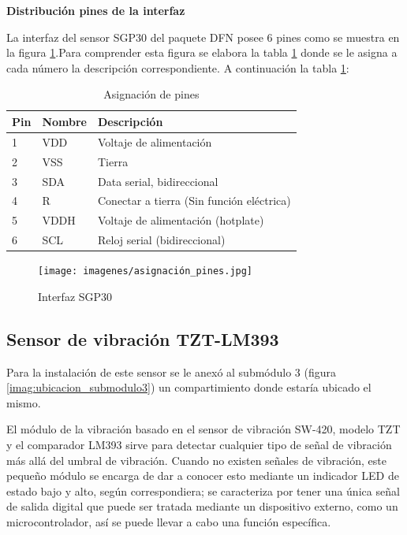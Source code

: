 \textbf{Distribución pines de la interfaz}

La interfaz del sensor SGP30 del paquete DFN posee 6 pines como se muestra en la figura \ref{imag:interfaz_sgp30}.Para comprender esta figura se elabora la tabla \ref{tab:asignacion_pines} donde se le asigna a cada número la descripción correspondiente. A continuación la tabla \ref{tab:asignacion_pines}:

\begin{table}[H]
    \centering
    \caption{Asignación de pines}
    \label{tab:asignacion_pines}
    \begin{tabular}{|l|l|l|}
    \hline
    \rowcolor[HTML]{9698ED} 
    Pin & Nombre & Descripción                               \\ \hline
    1   & VDD    & Voltaje de alimentación                   \\ \hline
    2   & VSS    & Tierra                                    \\ \hline
    3   & SDA    & Data serial, bidireccional                \\ \hline
    4   & R      & Conectar a tierra (Sin función eléctrica) \\ \hline
    5   & VDDH   & Voltaje de alimentación (hotplate)        \\ \hline
    6   & SCL    & Reloj serial (bidireccional)              \\ \hline
    \end{tabular}
\end{table}

\begin{figure}[H]
    \centering
    \texttt{[image: imagenes/asignación\_pines.jpg]}
    \caption{Interfaz SGP30}
    \label{imag:interfaz_sgp30}
 \end{figure}

\subsection{Sensor de vibración TZT-LM393}

Para la instalación de este sensor se le anexó al submódulo 3 (figura \ref{imag:ubicacion_submodulo3}) un compartimiento donde estaría ubicado el mismo.

El módulo de la vibración basado en el sensor de vibración SW-420, modelo TZT y el comparador LM393 sirve para detectar cualquier tipo de señal de vibración más allá del umbral de vibración.
Cuando no existen señales de vibración, este pequeño módulo se encarga de dar a conocer esto mediante un indicador LED de estado bajo y alto, según correspondiera; se caracteriza por tener una única señal de salida digital que
puede ser tratada mediante un dispositivo externo, como un microcontrolador, así se puede llevar a cabo una función específica.\\

